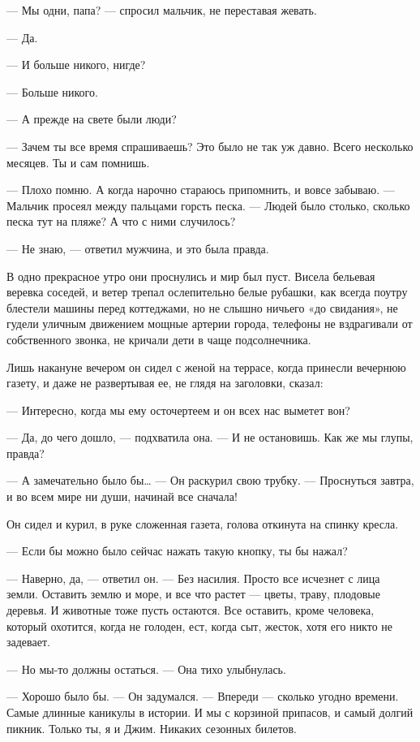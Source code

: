 — Мы одни, папа? — спросил мальчик, не переставая жевать.

— Да.

— И больше никого, нигде?

— Больше никого.

— А прежде на свете были люди?

— Зачем ты все время спрашиваешь? Это было не так уж давно. Всего несколько
месяцев. Ты и сам помнишь.

— Плохо помню. А когда нарочно стараюсь припомнить, и вовсе забываю. — Мальчик
просеял между пальцами горсть песка. — Людей было столько, сколько песка тут на
пляже? А что с ними случилось?

— Не знаю, — ответил мужчина, и это была правда.

В одно прекрасное утро они проснулись и мир был пуст. Висела бельевая веревка
соседей, и ветер трепал ослепительно белые рубашки, как всегда поутру блестели
машины перед коттеджами, но не слышно ничьего «до свидания», не гудели уличным
движением мощные артерии города, телефоны не вздрагивали от собственного
звонка, не кричали дети в чаще подсолнечника.

Лишь накануне вечером он сидел с женой на террасе, когда принесли вечернюю
газету, и даже не развертывая ее, не глядя на заголовки, сказал:

— Интересно, когда мы ему осточертеем и он всех нас выметет вон?

— Да, до чего дошло, — подхватила она. — И не остановишь. Как же мы глупы,
правда?

— А замечательно было бы… — Он раскурил свою трубку. — Проснуться завтра, и во
всем мире ни души, начинай все сначала!

Он сидел и курил, в руке сложенная газета, голова откинута на спинку кресла.

— Если бы можно было сейчас нажать такую кнопку, ты бы нажал?

— Наверно, да, — ответил он. — Без насилия. Просто все исчезнет с лица земли.
Оставить землю и море, и все что растет — цветы, траву, плодовые деревья. И
животные тоже пусть остаются. Все оставить, кроме человека, который охотится,
когда не голоден, ест, когда сыт, жесток, хотя его никто не задевает.

— Но мы-то должны остаться. — Она тихо улыбнулась.

— Хорошо было бы. — Он задумался. — Впереди — сколько угодно времени. Самые
длинные каникулы в истории. И мы с корзиной припасов, и самый долгий пикник.
Только ты, я и Джим. Никаких сезонных билетов.

